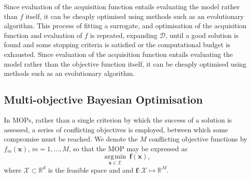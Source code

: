 \documentclass[conference]{IEEEtran}
\newcommand{\parameterspace}{\mathcal{X}}
\newcommand{\ndim}{d}
\newcommand{\nobj}{M}
\DeclareMathOperator*{\argmin}{\arg\!\min}
\newcommand\mX{\mathcal{X}}
\newcommand{\bx}{\mathbf{x}}
\begin{document}
 Since evaluation of the acquisition function entails evaluating the model
 rather than $f$ itself, it can be  cheaply optimised using methods such as
 an evolutionary algorithm. 
 This process of fitting a surrogate,
 and optimisation of the acquisition function and evaluation of $f$ is
 repeated, expanding $\mathcal{D}$, until a good solution is found and some
 stopping criteria is satisfied or the computational budget is exhausted.
 Since evaluation of the acquisition function entails evaluating the model
 rather than the objective function itself, it can be cheaply optimised
 using methods such as an evolutionary algorithm. 
 

\subsection{Multi-objective Bayesian Optimisation}\label{section:background_MOPs}
In MOPs, rather than a single criterion by which the success of a solution is assessed, a series of conflicting objectives is employed, between which some compromise must be reached. We denote the $\nobj$ conflicting objective functions by $f_m(\bx)$, $m = 1, \ldots, \nobj$, so that the MOP may be expressed 
as 
\begin{equation}\label{eqn: min_F}
\underset{\mathbf{x} \in \mX}{\argmin}\:\mathbf{f}(\mathbf{x}), 
\end{equation}
where $\parameterspace \subset \mathbb{R}^\ndim$ is the feasible space and and $\mathbf{f}: \parameterspace \mapsto \mathbb{R}^{\nobj}$.
\end{document}
